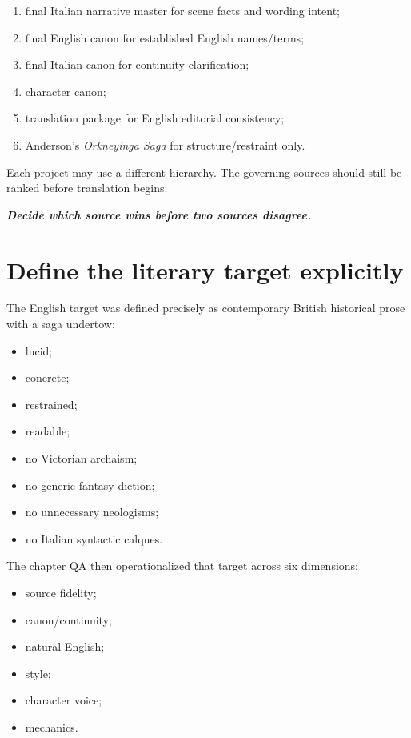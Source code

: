 \documentclass[11pt,oneside,openany]{book}
\renewenvironment{quote}{\begin{insightbox}\itshape}{\end{insightbox}}
\providecommand{\tightlist}{%
  \setlength{\itemsep}{0pt}\setlength{\parskip}{0pt}}
\begin{document}
\begin{enumerate}
\def\labelenumi{\arabic{enumi}.}
\tightlist
\item
  final Italian narrative master for scene facts and wording intent;
\item
  final English canon for established English names/terms;
\item
  final Italian canon for continuity clarification;
\item
  character canon;
\item
  translation package for English editorial consistency;
\item
  Anderson's \emph{Orkneyinga Saga} for structure/restraint only.
\end{enumerate}

Each project may use a different hierarchy. The governing sources should still be ranked before translation begins:

\begin{quote}
\textbf{Decide which source wins before two sources disagree.}

\end{quote}

\chapter{Define the literary target explicitly}

The English target was defined precisely as contemporary British historical prose with a saga undertow:

\begin{itemize}
\tightlist
\item
  lucid;
\item
  concrete;
\item
  restrained;
\item
  readable;
\item
  no Victorian archaism;
\item
  no generic fantasy diction;
\item
  no unnecessary neologisms;
\item
  no Italian syntactic calques.
\end{itemize}

The chapter QA then operationalized that target across six dimensions:

\begin{itemize}
\tightlist
\item
  source fidelity;
\item
  canon/continuity;
\item
  natural English;
\item
  style;
\item
  character voice;
\item
  mechanics.
\end{itemize}
\end{document}
